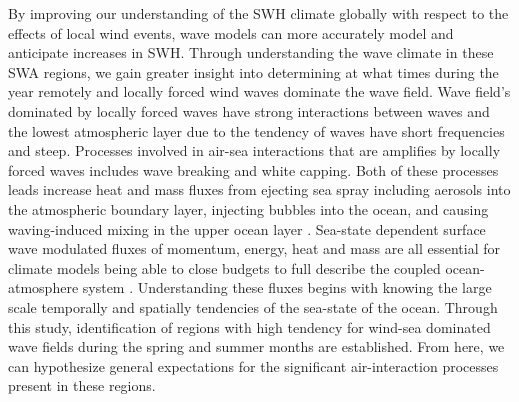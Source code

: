 \documentclass[draft,linenumbers]{agujournal2018}
\begin{document}
By improving our understanding of the SWH climate globally with respect to the effects of local wind events, wave models can more accurately model and anticipate increases in SWH. Through understanding the wave climate in these SWA regions, we gain greater insight into determining at what times during the year remotely and locally forced wind waves dominate the wave field. Wave field's dominated by locally forced waves have strong interactions between waves and the lowest atmospheric layer \cite{cavaleri2012wind} due to the tendency of waves have short frequencies and steep. Processes involved in air-sea interactions that are amplifies by locally forced waves includes wave breaking and white capping. Both of these processes leads increase heat and mass fluxes from ejecting sea spray including aerosols into the atmospheric boundary layer, injecting bubbles into the ocean, and causing waving-induced mixing in the upper ocean layer \cite{cavaleri2012wind}. Sea-state dependent surface wave modulated fluxes of momentum, energy, heat and mass are all essential for climate models being able to close budgets to full describe the coupled ocean-atmosphere system \cite{cavaleri2012wind}. Understanding these fluxes begins with knowing the large scale temporally and spatially tendencies of the sea-state of the ocean. Through this study, identification of regions with high tendency for wind-sea dominated wave fields during the spring and summer months are established. From here, we can hypothesize general expectations for the significant air-interaction processes present in these regions.







\end{document}
